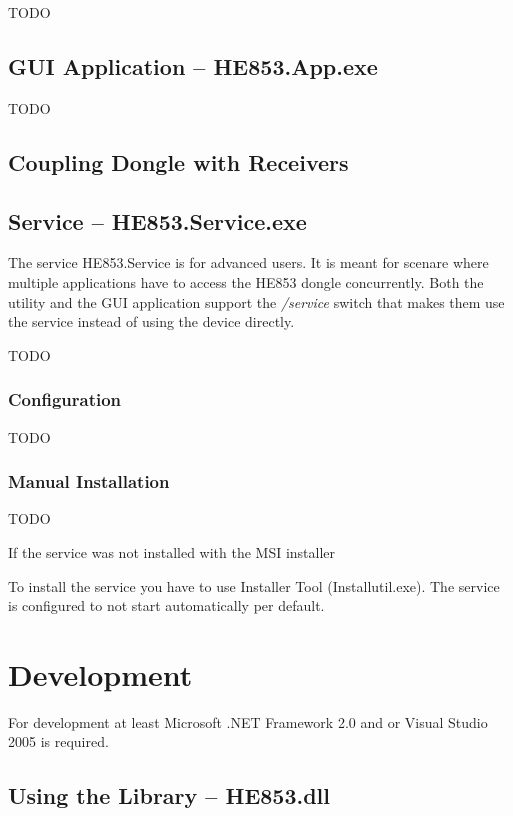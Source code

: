 \documentclass[
a4paper,
oneside,
halfparskip*,
normalheadings,
]
{scrbook}
\begin{document}
TODO

\section{GUI Application -- HE853.App.exe}

TODO

\section{Coupling Dongle with Receivers}


\section{Service -- HE853.Service.exe}

The service HE853.Service is for advanced users. It is meant for scenare where multiple
applications have to access the HE853 dongle concurrently. Both the utility and the
GUI application support the \textit{/service} switch that makes them use the service
instead of using the device directly.

TODO

\subsection{Configuration}

TODO

\subsection{Manual Installation}

TODO

If the service was not installed with the MSI installer

To install the service you have to use Installer Tool (Installutil.exe). The service is
configured to not start automatically per default. 




\chapter{Development}

For development at least Microsoft .NET Framework 2.0 and or Visual Studio 2005 is required.

\section{Using the Library -- HE853.dll}
\end{document}
